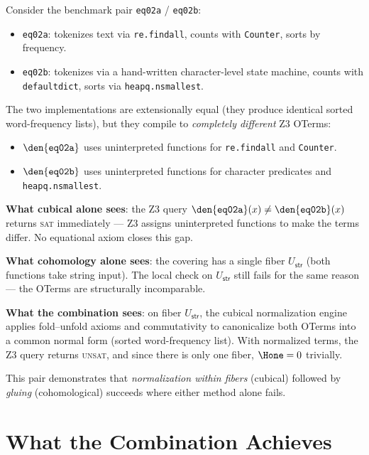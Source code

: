\begin{example}
\label{ex:eq02}
Consider the benchmark pair \texttt{eq02a} / \texttt{eq02b}:
\begin{itemize}
  \item \texttt{eq02a}: tokenizes text via \texttt{re.findall},
    counts with \texttt{Counter}, sorts by frequency.
  \item \texttt{eq02b}: tokenizes via a hand-written character-level
    state machine, counts with \texttt{defaultdict}, sorts via
    \texttt{heapq.nsmallest}.
\end{itemize}

The two implementations are extensionally equal (they produce
identical sorted word-frequency lists), but they compile to
\emph{completely different} Z3 OTerms:
\begin{itemize}
  \item $\den{\mathtt{eq02a}}$ uses uninterpreted functions for
    \texttt{re.findall} and \texttt{Counter}.
  \item $\den{\mathtt{eq02b}}$ uses uninterpreted functions for
    character predicates and \texttt{heapq.nsmallest}.
\end{itemize}

\textbf{What cubical alone sees}: the Z3 query
$\den{\mathtt{eq02a}}(x) \neq \den{\mathtt{eq02b}}(x)$ returns
\textsc{sat} immediately --- Z3 assigns uninterpreted functions to
make the terms differ.  No equational axiom closes this gap.

\textbf{What cohomology alone sees}: the covering has a single
fiber $U_{\mathsf{str}}$ (both functions take string input).  The
local check on $U_{\mathsf{str}}$ still fails for the same reason
--- the OTerms are structurally incomparable.

\textbf{What the combination sees}: on fiber $U_{\mathsf{str}}$,
the cubical normalization engine applies fold--unfold axioms and
commutativity to canonicalize both OTerms into a common normal form
(sorted word-frequency list).  With normalized terms, the Z3 query
returns \textsc{unsat}, and since there is only one fiber,
$\Hone = 0$ trivially.

This pair demonstrates that \emph{normalization within fibers}
(cubical) followed by \emph{gluing} (cohomological) succeeds
where either method alone fails.
\end{example}

\section{What the Combination Achieves}

